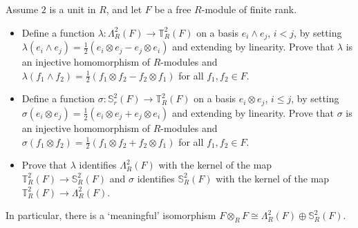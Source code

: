 \documentclass[../../master.tex]{subfiles}
\begin{document}
\begin{problem}
    Assume $2$ is a unit in $R$, and let $F$ be a free $R$-module of finite rank.
    \begin{itemize}
        \item Define a function $\lambda : \Lambda_R^{2}(F) \to \mathbb{T}_R^{2}(F)$ on a basis $e_i \wedge e_j$, $i < j$, by setting $\lambda(e_i \wedge e_j) = \frac{1}{2} (e_i \otimes e_j - e_j \otimes e_i)$ and extending by linearity.
            Prove that $\lambda$ is an injective homomorphism of $R$-modules and $\lambda(f_1 \wedge f_2) = \frac{1}{2}(f_1 \otimes f_2 - f_2 \otimes f_1)$ for all $f_1, f_2 \in F$.
        \item Define a function $\sigma : \mathbb{S}_r^2(F) \to \mathbb{T}_R^2(F)$ on a basis $e_i \otimes e_j$, $i \leq j$, by setting $\sigma(e_i \otimes e_j) = \frac{1}{2} (e_i \otimes e_j + e_j \otimes e_i)$ and extending by linearity.
            Prove that $\sigma$ is an injective homomorphism of $R$-modules and $\sigma(f_1 \otimes f_2) = \frac{1}{2}(f_1 \otimes f_2 + f_2 \otimes f_1)$ for all $f_1, f_2 \in F$.
        \item Prove that $\lambda$ identifies $\Lambda_R^2(F)$ with the kernel of the map $\mathbb{T}_R^2(F) \to \mathbb{S}_R^2(F)$ and $\sigma$ identifies $\mathbb{S}_R^2(F)$ with the kernel of the map $\mathbb{T}_R^2(F) \to \Lambda_R^2(F)$.
    \end{itemize}
    In particular, there is a `meaningful' isomorphism $F \otimes_R F \cong \Lambda_R^2(F) \oplus \mathbb{S}_R^2(F)$.
\end{problem}
\end{document}
